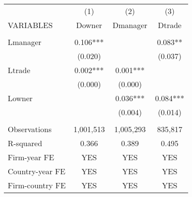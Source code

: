 \begin{tabular}{lccc} \hline
 & (1) & (2) & (3) \\
VARIABLES & Downer & Dmanager & Dtrade \\ \hline
 &  &  &  \\
Lmanager & 0.106*** &  & 0.083** \\
 & (0.020) &  & (0.037) \\
Ltrade & 0.002*** & 0.001*** &  \\
 & (0.000) & (0.000) &  \\
Lowner &  & 0.036*** & 0.084*** \\
 &  & (0.004) & (0.014) \\
 &  &  &  \\
Observations & 1,001,513 & 1,005,293 & 835,817 \\
R-squared & 0.366 & 0.389 & 0.495 \\
Firm-year FE & YES & YES & YES \\
Country-year FE & YES & YES & YES \\
 Firm-country FE & YES & YES & YES \\ \hline
\end{tabular}
